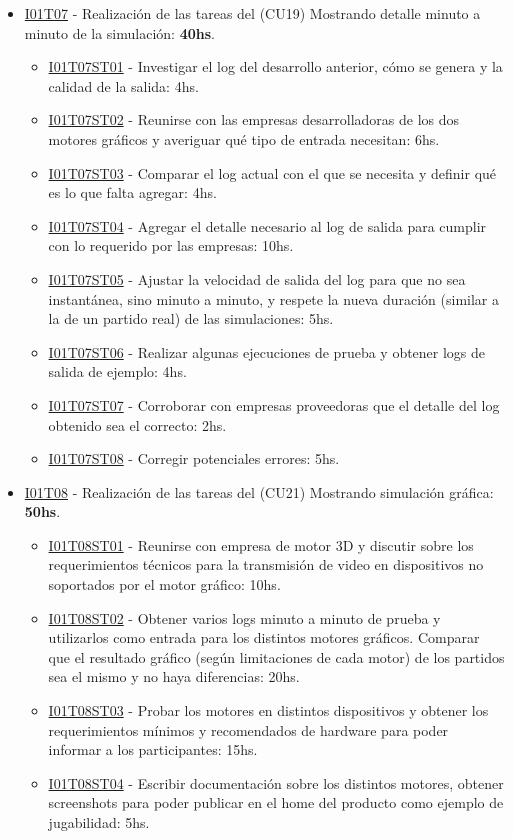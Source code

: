 \begin{itemize}
\item \underline{I01T07} - Realización de las tareas del (CU19) Mostrando detalle minuto a minuto de la simulación: \textbf{40hs}.
  \begin{itemize}
    \item \underline{I01T07ST01} - Investigar el log del desarrollo anterior, cómo se genera y la calidad de la salida: 4hs.
    \item \underline{I01T07ST02} - Reunirse con las empresas desarrolladoras de los dos motores gráficos y averiguar qué tipo de entrada necesitan: 6hs.
    \item \underline{I01T07ST03} - Comparar el log actual con el que se necesita y definir qué es lo que falta agregar: 4hs.
    \item \underline{I01T07ST04} - Agregar el detalle necesario al log de salida para cumplir con lo requerido por las empresas: 10hs.
    \item \underline{I01T07ST05} - Ajustar la velocidad de salida del log para que no sea instantánea, sino minuto a minuto, y respete la nueva duración (similar a la de un partido real) de las simulaciones: 5hs.
    \item \underline{I01T07ST06} - Realizar algunas ejecuciones de prueba y obtener logs de salida de ejemplo: 4hs.
    \item \underline{I01T07ST07} - Corroborar con empresas proveedoras que el detalle del log obtenido sea el correcto: 2hs.    
    \item \underline{I01T07ST08} - Corregir potenciales errores: 5hs.
  \end{itemize}
\hfill

\item \underline{I01T08} - Realización de las tareas del (CU21) Mostrando simulación gráfica: \textbf{50hs}.
  \begin{itemize}
    \item \underline{I01T08ST01} - Reunirse con empresa de motor 3D y discutir sobre los requerimientos técnicos para la transmisión de video en dispositivos no soportados por el motor gráfico: 10hs.
    \item \underline{I01T08ST02} - Obtener varios logs minuto a minuto de prueba y utilizarlos como entrada para los distintos motores gráficos. Comparar que el resultado gráfico (según limitaciones de cada motor) de los partidos sea el mismo y no haya diferencias: 20hs.
    \item \underline{I01T08ST03} - Probar los motores en distintos dispositivos y obtener los requerimientos mínimos y recomendados de hardware para poder informar a los participantes: 15hs.
    \item \underline{I01T08ST04} - Escribir documentación sobre los distintos motores, obtener screenshots para poder publicar en el home del producto como ejemplo de jugabilidad: 5hs.
  \end{itemize}
\hfill



\end{itemize}
